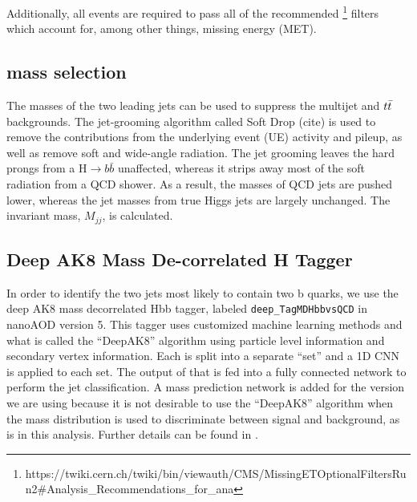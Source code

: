 Additionally, all events are required to pass all of the recommended \footnote{https://twiki.cern.ch/twiki/bin/viewauth/CMS/MissingETOptionalFiltersRun2\#Analysis\_Recommendations\_for\_ana} filters which account for, among other things, missing energy (MET).

\subsection{\texorpdfstring{\PH}{H} mass selection\label{ss:EvtSelMass}}

The masses of the two leading jets can be used to suppress the multijet and $t\bar{t} $ backgrounds. The jet-grooming algorithm called Soft Drop (cite) is used to remove the contributions from the underlying event (UE) activity and pileup, as well as remove soft and wide-angle radiation.  The jet grooming leaves the hard prongs from a H$\to b\bar b$ unaffected, whereas it strips away most of the soft radiation from a QCD shower.  As a result, the masses of QCD jets are pushed lower, whereas the jet masses from true Higgs jets are largely unchanged. The invariant mass, $M_{jj}$, is calculated. 

\subsection{Deep AK8 Mass De-correlated H Tagger\label{ss:deepAK8}}
In order to identify the two jets most likely to contain two b quarks, we use the deep AK8 mass decorrelated Hbb tagger, labeled \texttt{deep\_TagMDHbbvsQCD} \cite{CMS:2019gpd} in nanoAOD version 5. This tagger uses customized machine learning methods and what is called the ``DeepAK8'' algorithm using particle level information and secondary vertex information. Each is split into a separate ``set'' and a 1D CNN is applied to each set. The output of that is fed into a fully connected network to perform the jet classification. A mass prediction network is added for the version we are using because it is not desirable to use the ``DeepAK8'' algorithm when the mass distribution is used to discriminate between signal and background, as is in this analysis. Further details can be found in \cite{CMS:2019gpd}. 

